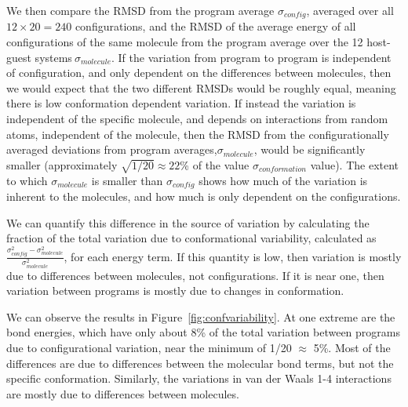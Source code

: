We then compare the RMSD from the program average $\sigma_{config}$,
averaged over all $12 \times 20 = 240$ configurations, and the RMSD of
the average energy of all configurations of the same molecule from the
program average over the 12 host-guest systems$~\sigma_{molecule}$. If
the variation from program to program is independent of configuration,
and only dependent on the differences between molecules, then we would
expect that the two different RMSDs would be roughly equal, meaning
there is low conformation dependent variation.  If instead the
variation is independent of the specific molecule, and depends on
interactions from random atoms, independent of the molecule, then the
RMSD from the configurationally averaged deviations from program
averages,$\sigma_{molecule}$, would be significantly smaller
(approximately $\sqrt{1/20} \approx 22$\% of the value
$\sigma_{conformation}$ value).
The extent to which $\sigma_{molecule}$ is smaller than
$\sigma_{config}$ shows how much of the variation is inherent to the
molecules, and how much is only dependent on the configurations.

We can quantify this difference in the source of variation by
calculating the fraction of the total variation due to conformational
variability, calculated as
$\frac{\sigma^2_{config}-\sigma^2_{molecule}}{\sigma^2_{molecule}}$,
for each energy term. If this quantity is low, then variation is
mostly due to differences between molecules, not configurations.  If
it is near one, then variation between programs is mostly due to
changes in conformation.

We can observe the results in Figure~\ref{fig:confvariability}. At one
extreme are the bond energies, which have only about 8\% of the total
variation between programs due to configurational variation, near the
minimum of 1/20 $\approx$ 5\%. Most of the differences are due to
differences between the molecular bond terms, but not the specific
conformation.  Similarly, the variations in van der Waals 1-4
interactions are mostly due to differences between molecules.

